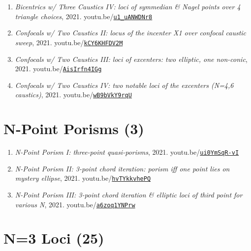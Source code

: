 \documentclass[12pt]{article}
\begin{document}
\begin{enumerate}[resume]
\item \textit{Bicentrics w/ Three Caustics IV: loci of symmedian \& Nagel points over 4 triangle choices}, 2021. youtu.be/\href{https://youtu.be/u1_uANWDNr8}{\nolinkurl{u1\_uANWDNr8}}
\item \textit{Confocals w/ Two Caustics II: locus of the incenter X1 over confocal caustic sweep}, 2021. youtu.be/\href{https://youtu.be/kCY6KHFDV2M}{\nolinkurl{kCY6KHFDV2M}}
\item \textit{Confocals w/ Two Caustics III: loci of excenters: two elliptic, one non-conic}, 2021. youtu.be/\href{https://youtu.be/AisIrfn4IGg}{\nolinkurl{AisIrfn4IGg}}
\item \textit{Confocals w/ Two Caustics IV: two notable loci of the excenters (N=4,6 caustics)}, 2021. youtu.be/\href{https://youtu.be/wB9bVkY9rqU}{\nolinkurl{wB9bVkY9rqU}}
\end{enumerate}

\section{N-Point Porisms (3)}

\begin{enumerate}[resume]
\item \textit{N-Point Porism I: three-point quasi-porisms}, 2021. youtu.be/\href{https://youtu.be/ui0YmSqR-vI}{\nolinkurl{ui0YmSqR-vI}}
\item \textit{N-Point Porism II: 3-point chord iteration: porism iff one point lies on mystery ellipse}, 2021. youtu.be/\href{https://youtu.be/hvTYkkvhePQ}{\nolinkurl{hvTYkkvhePQ}}
\item \textit{N-Point Porism III: 3-point chord iteration \& elliptic loci of third point for various N}, 2021. youtu.be/\href{https://youtu.be/a6zoq1YNPrw}{\nolinkurl{a6zoq1YNPrw}}
\end{enumerate}

\section{N=3 Loci (25)}
\end{document}
